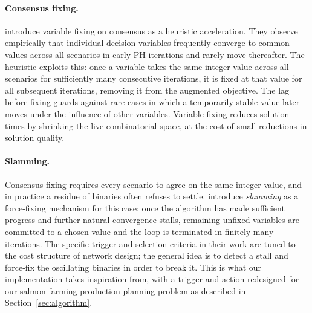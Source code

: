 \documentclass[12pt,a4paper]{article}
\begin{document}
\paragraph{Consensus fixing.}
\citet{watson2011progressive} introduce variable fixing on consensus as
a heuristic acceleration. They observe empirically that individual
decision variables frequently converge to common values across all
scenarios in early PH iterations and rarely move thereafter. The
heuristic exploits this: once a variable takes the same integer value
across all scenarios for sufficiently many consecutive iterations, it
is fixed at that value for all subsequent iterations, removing it from
the augmented objective. The lag before fixing guards against rare
cases in which a temporarily stable value later moves under the
influence of other variables.
Variable fixing reduces solution times by shrinking the live
combinatorial space, at the cost of small reductions in solution
quality.

\paragraph{Slamming.}
Consensus fixing requires every scenario to agree on the same integer
value, and in practice a residue of binaries often refuses to settle.
\citet{watson2011progressive} introduce \emph{slamming} as a
force-fixing mechanism for this case: once the algorithm has made
sufficient progress and further natural convergence stalls, remaining
unfixed variables are committed to a chosen value and the loop is
terminated in finitely many iterations. The specific trigger and
selection criteria in their work are tuned to the cost structure of
network design; the general idea is to detect a stall and
force-fix the oscillating binaries in order to break it. This is what our implementation
takes inspiration from, with a trigger and action redesigned for our
salmon farming production planning problem as described in
Section~\ref{sec:algorithm}.
\end{document}
